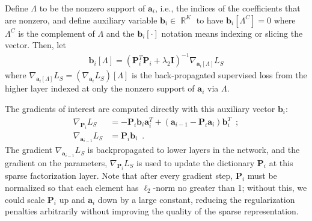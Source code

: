 \documentclass[10pt,twocolumn,letterpaper]{article}
\newcommand{\reals}{\mathop \mathbb{R}}
\renewcommand{\vec}{\mathbf}
\newcommand{\grad}[2]{\nabla_{\!\! #1} #2}
\newcommand{\loss}{\ensuremath{\ell}}
\newcommand{\x}{\vec{x}}
\newcommand{\Z}{\vec{Z}}
\newcommand{\D}{\vec{D}}
\renewcommand{\P}{\vec{P}}
\renewcommand{\a}{\vec{a}}
\renewcommand{\b}{\vec{b}}
\newcommand{\bbeta}{\boldsymbol{\beta}}
\begin{document}
Define $\Lambda$ to be the nonzero support of $\a_i$, i.e., the indices of the coefficients that are nonzero, and define auxiliary variable $\b_i \in \reals^K$ to have $\b_i[\Lambda^C] = 0$ where $\Lambda^C$ is the complement of $\Lambda$ and the $\b_i[\cdot]$ notation means indexing or slicing the vector. Then, let
%
\begin{align}
    \b_i[\Lambda] = (\P_i^{T}\P_i+\lambda_2\mathbf{I})^{-1} \grad{\a_{i}[\Lambda]}{L_S}
    \label{eq:b}
\end{align}
%
where $\grad{\a_{i}[\Lambda]}{L_S} = (\grad{\a_{i}}{L_S})[\Lambda]$ is the back-propagated supervised loss from the higher layer indexed at only the nonzero support of $\a_i$ via $\Lambda$.

The gradients of interest are computed directly with this auxiliary vector $\b_i$:
\begin{align}
    \grad{\P_i}{L_S} &= -\P_i\b_i\a_i^{T} + (\a_{i-1}-\P_i\a_i)\b_i^{T}
    \enspace;
    \label{eq:sfgradpi}
    \\
    \grad{\a_{i-1}}{L_S} &= \P_i\b_i
    \enspace.
    \label{eq:sfgradaminus1}
\end{align}
%
The gradient $\grad{\a_{i-1}}{L_S}$ is backpropagated to lower layers in the network, and the gradient on the parameters, $\grad{\P_i}{L_S}$ is used to update the dictionary $\P_i$ at this sparse factorization layer. Note that after every gradient step, $\P_i$ must be normalized so that each element has $\ell_2$-norm no greater than 1; without this, we could scale $\P_i$ up and $\a_i$ down by a large constant, reducing the regularization penalties arbitrarily without improving the quality of the sparse representation. 







%
\end{document}
